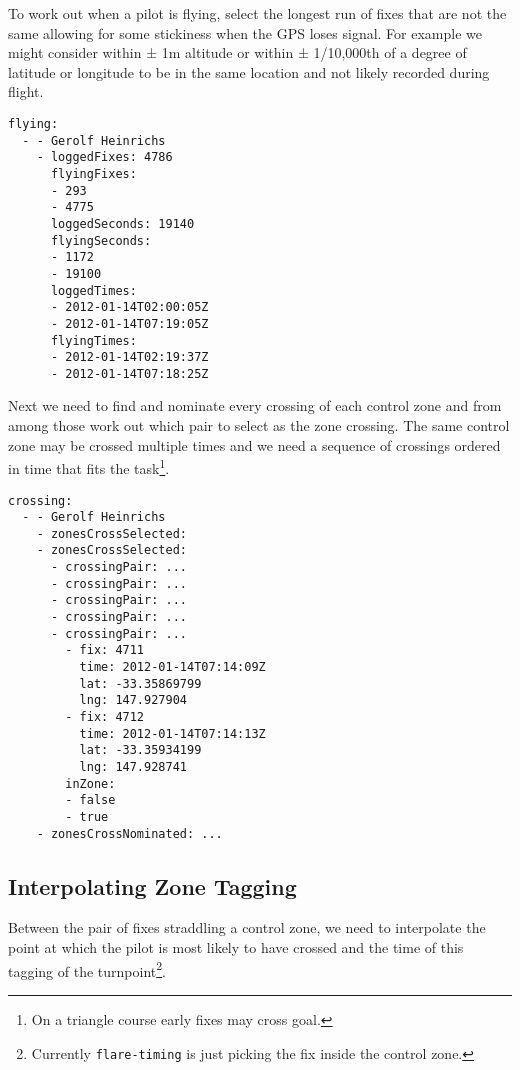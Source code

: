 \documentclass[gap.tex]{subfiles}
\begin{document}
To work out when a pilot is flying, select the longest run of fixes that are
not the same allowing for some stickiness when the GPS loses signal. For
example we might consider within ± 1m altitude or within ± 1/10,000th of
a degree of latitude or longitude to be in the same location and not likely
recorded during flight.

\begin{lstlisting}[caption={Which fixes are considered flown, \texttt{flying} nodes of \texttt{*.cross-zone.yaml}.}]
flying:
  - - Gerolf Heinrichs
    - loggedFixes: 4786
      flyingFixes:
      - 293
      - 4775
      loggedSeconds: 19140
      flyingSeconds:
      - 1172
      - 19100
      loggedTimes:
      - 2012-01-14T02:00:05Z
      - 2012-01-14T07:19:05Z
      flyingTimes:
      - 2012-01-14T02:19:37Z
      - 2012-01-14T07:18:25Z
\end{lstlisting}

Next we need to find and nominate every crossing of each control zone and from
among those work out which pair to select as the zone crossing. The same
control zone may be crossed multiple times and we need a sequence of crossings
ordered in time that fits the task\footnote{On a triangle course early fixes
may cross goal.}.

\begin{lstlisting}[caption={Selected crossings, one for each zone, \texttt{crossing} nodes of \texttt{*.cross-zone.yaml}.}]
crossing:
  - - Gerolf Heinrichs
    - zonesCrossSelected:
    - zonesCrossSelected:
      - crossingPair: ...
      - crossingPair: ...
      - crossingPair: ...
      - crossingPair: ...
      - crossingPair: ...
        - fix: 4711
          time: 2012-01-14T07:14:09Z
          lat: -33.35869799
          lng: 147.927904
        - fix: 4712
          time: 2012-01-14T07:14:13Z
          lat: -33.35934199
          lng: 147.928741
        inZone:
        - false
        - true
    - zonesCrossNominated: ...
\end{lstlisting}

\newpage
\subsection{Interpolating Zone Tagging}

Between the pair of fixes straddling a control zone, we need to interpolate the
point at which the pilot is most likely to have crossed and the time of this
tagging of the turnpoint\footnote{Currently \texttt{flare-timing} is just
picking the fix inside the control zone.}.
\end{document}
